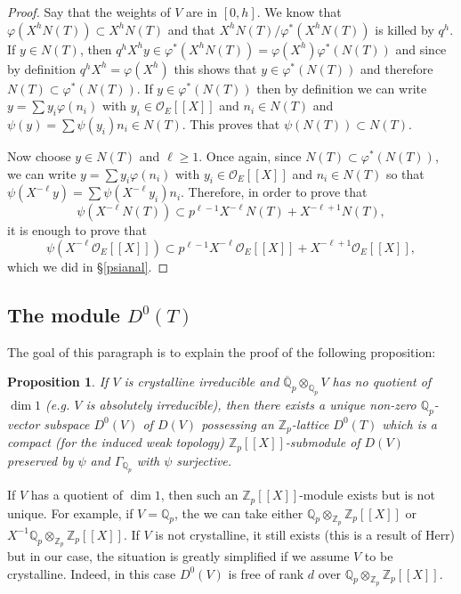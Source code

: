 \documentclass[11pt]{amsart}
\def\Z{{\mathbb Z}_p}
\def\Q{{\mathbb Q}_p}
\def\O{{\mathcal O}_E}
\def\Qp{{\mathbb Q}_p}
\newtheorem{prop}[definit]{\bf{Proposition}}
\begin{document}
\begin{proof} 
Say that the weights of $V$ are in $[0,h]$. We 
know that $\varphi(X^h N(T)) \subset X^h N(T)$ and  
that $X^h N(T) / \varphi^*(X^h N(T))$ is killed by $q^h$. If $y \in N(T)$, 
then $q^h X^h y \in \varphi^*(X^h N(T)) = \varphi(X^h) \varphi^*(N(T))$ and 
since by definition  $q^h X^h  =\varphi(X^h)$ this shows that $y \in 
\varphi^*(N(T))$ and therefore $N(T) \subset \varphi^*(N(T))$. If $y \in 
\varphi^*(N(T))$ then by definition we can write $y=\sum y_i \varphi(n_i)$ 
with $y_i \in \O[[X]]$ and $n_i \in N(T)$ and $\psi(y) = \sum 
\psi(y_i) n_i \in N(T)$. This proves that $\psi(N(T)) \subset N(T)$.  
 
Now choose $y \in N(T)$ and $\ell \geq 1$. Once again, since $N(T) 
\subset \varphi^*(N(T))$, we can write  $y=\sum y_i \varphi(n_i)$ 
with $y_i \in \O[[X]]$ and $n_i \in N(T)$ so that $\psi(X^{-\ell} y) = 
\sum \psi(X^{-\ell} y_i) n_i$. Therefore, in order 
to prove that \[ \psi(X^{-\ell} N(T)) \subset p^{\ell-1}  
X^{-\ell} N(T) + X^{-\ell+1} N(T), \] 
it is enough to prove that 
\[ \psi(X^{-\ell} \O[[X]]) \subset p^{\ell-1}  
X^{-\ell} \O[[X]] + X^{-\ell+1} \O[[X]], \] 
which we did in \S\ref{psianal}. 
\end{proof} 
 
\subsection{The module $D^0(T)$}\label{herrmodule} 
The goal of this paragraph is to explain the proof of the following 
proposition:  
 
\begin{prop}\label{bh} 
If $V$ is crystalline irreducible and  
$\overline\Qp \otimes_{\Q} V$ 
has no quotient of $\dim 1$ (e.g. $V$ is absolutely irreducible), 
then there exists a \emph{unique}  
non-zero $\Q$-vector subspace $D^0(V)$ of $D(V)$  
possessing an $\Z$-lattice $D^0(T)$ 
which is a compact  
(for the induced weak topology) 
$\Z[[X]]$-submodule  
of $D(V)$ preserved by $\psi$ and $\Gamma_{\Q}$ with $\psi$ surjective. 
\end{prop} 
 
If $V$ has a quotient of $\dim 1$, then such an $\Z[[X]]$-module exists 
but is not unique.  
For example, if $V=\Qp$, the we can take either $\Q \otimes_{\Z} 
\Z[[X]]$ or $X^{-1} \Q \otimes_{\Z} \Z[[X]]$. 
If $V$ is not crystalline, it still exists (this is 
a result of Herr) but in our case, the situation is greatly simplified 
if we assume $V$ to be crystalline. Indeed, in this case $D^0(V)$ is 
free of rank $d$ over $\Q \otimes_{\Z} \Z[[X]]$.  
 
\end{document}
